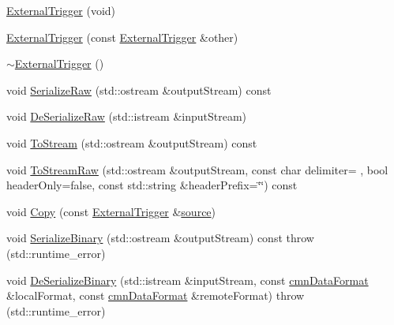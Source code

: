 \begin{DoxyCompactItemize}
\item 
\hyperlink{classsvl_filter_source_video_capture_types_1_1_external_trigger_af731b4c50a28f4c021e99daca724d8ad}{External\+Trigger} (void)
\item 
\hyperlink{classsvl_filter_source_video_capture_types_1_1_external_trigger_a4099dc2309759544b57a5e8dcc305eb7}{External\+Trigger} (const \hyperlink{classsvl_filter_source_video_capture_types_1_1_external_trigger}{External\+Trigger} \&other)
\item 
\hyperlink{classsvl_filter_source_video_capture_types_1_1_external_trigger_a28abad13e7e924d06d8929200b0fc3df}{$\sim$\+External\+Trigger} ()
\item 
void \hyperlink{classsvl_filter_source_video_capture_types_1_1_external_trigger_ac7d183abd22bf87fe7817ced87df38c6}{Serialize\+Raw} (std\+::ostream \&output\+Stream) const 
\item 
void \hyperlink{classsvl_filter_source_video_capture_types_1_1_external_trigger_a2773c71ca3f88e0168feb6d7dd6e00b2}{De\+Serialize\+Raw} (std\+::istream \&input\+Stream)
\item 
void \hyperlink{classsvl_filter_source_video_capture_types_1_1_external_trigger_a3ffd3d60d84493302e05482376a850e4}{To\+Stream} (std\+::ostream \&output\+Stream) const 
\item 
void \hyperlink{classsvl_filter_source_video_capture_types_1_1_external_trigger_adb614b2edae33908607bfcc6a8e48e25}{To\+Stream\+Raw} (std\+::ostream \&output\+Stream, const char delimiter= \textquotesingle{} \textquotesingle{}, bool header\+Only=false, const std\+::string \&header\+Prefix=\char`\"{}\char`\"{}) const 
\item 
void \hyperlink{classsvl_filter_source_video_capture_types_1_1_external_trigger_a6cf962483122b2c09ae62ea7ece0426d}{Copy} (const \hyperlink{classsvl_filter_source_video_capture_types_1_1_external_trigger}{External\+Trigger} \&\hyperlink{classsvl_filter_source_video_capture_types_1_1_external_trigger_a90c5c2fc64176eb2220cdd9890795301}{source})
\item 
void \hyperlink{classsvl_filter_source_video_capture_types_1_1_external_trigger_af9dcb778660c63ac0f7cb757bfc3cb53}{Serialize\+Binary} (std\+::ostream \&output\+Stream) const   throw (std\+::runtime\+\_\+error)
\item 
void \hyperlink{classsvl_filter_source_video_capture_types_1_1_external_trigger_aa0dc802a0bddc29f459467f29750a1dc}{De\+Serialize\+Binary} (std\+::istream \&input\+Stream, const \hyperlink{classcmn_data_format}{cmn\+Data\+Format} \&local\+Format, const \hyperlink{classcmn_data_format}{cmn\+Data\+Format} \&remote\+Format)  throw (std\+::runtime\+\_\+error)

\end{DoxyCompactItemize}
